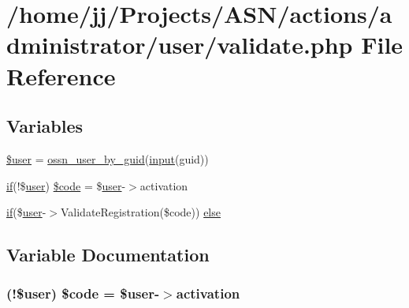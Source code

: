 \hypertarget{validate_8php}{}\section{/home/jj/\+Projects/\+A\+S\+N/actions/administrator/user/validate.php File Reference}
\label{validate_8php}
\subsection*{Variables}
\begin{DoxyCompactItemize}
\item 
\hyperlink{validate_8php_a598ca4e71b15a1313ec95f0df1027ca5}{\$user} = \hyperlink{ossn_8lib_8users_8php_aaee344fada9e6e15470587c7cd94ea8b}{ossn\+\_\+user\+\_\+by\+\_\+guid}(\hyperlink{ossn_8lib_8input_8php_a64ebee98b041c4f75f71ed3cd73cc8ed}{input}(\textquotesingle{}guid\textquotesingle{}))
\item 
\hyperlink{jquery_8tokeninput_8js_ad8dd46a3cbc004569e34401e9e71771a}{if}(!\$\hyperlink{ossn_8config_8db_8example_8php_a802544b7ba9f79bbf24ef67773d53bed}{user}) \hyperlink{validate_8php_a61c932a527546c905ebcb0ae988d3969}{\$code} = \$\hyperlink{ossn_8config_8db_8example_8php_a802544b7ba9f79bbf24ef67773d53bed}{user}-\/$>$activation
\item 
\hyperlink{jquery_8tokeninput_8js_ad8dd46a3cbc004569e34401e9e71771a}{if}(\$\hyperlink{ossn_8config_8db_8example_8php_a802544b7ba9f79bbf24ef67773d53bed}{user}-\/$>$Validate\+Registration(\$code)) \hyperlink{validate_8php_a3f9d4ad5dc367c00e2516f0d03431aea}{else}
\end{DoxyCompactItemize}


\subsection{Variable Documentation}
\subsubsection[{\texorpdfstring{\$code}{$code}}]{ (!\${\bf user}) \$code = \${\bf user}-\/$>$activation}\hypertarget{validate_8php_a61c932a527546c905ebcb0ae988d3969}{}\label{validate_8php_a61c932a527546c905ebcb0ae988d3969}


